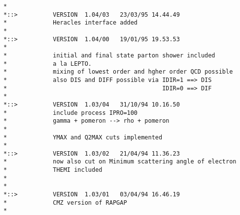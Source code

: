 \documentclass[10pt]{article} \usepackage{dina4}
\begin{document}
\begin{verbatim}
*
*::>          VERSION  1.04/03   23/03/95 14.44.49
*             Heracles interface added
*
*::>          VERSION  1.04/00   19/01/95 19.53.53
*
*             initial and final state parton shower included
*             a la LEPTO.
*             mixing of lowest order and hgher order QCD possible
*             also DIS and DIFF possible via IDIR=1 ==> DIS
*                                            IDIR=0 ==> DIF
*
*::>          VERSION  1.03/04   31/10/94 10.16.50
*             include process IPRO=100
*             gamma + pomeron --> rho + pomeron
*
*             YMAX and Q2MAX cuts implemented
*
*::>          VERSION  1.03/02   21/04/94 11.36.23
*             now also cut on Minimum scattering angle of electron
*             THEMI included
*
*
*::>          VERSION  1.03/01   03/04/94 16.46.19
*             CMZ version of RAPGAP
*


\end{verbatim}
\end{document}
